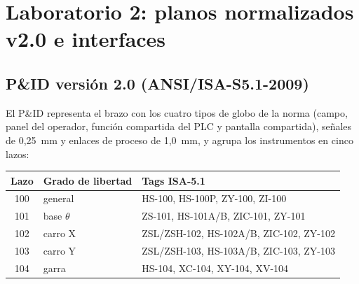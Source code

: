 \documentclass[a4paper,11pt]{article}
\begin{document}
\section{Laboratorio 2: planos normalizados v2.0 e interfaces}
\subsection{P\&ID versión 2.0 (ANSI/ISA-S5.1-2009)}
El P\&ID representa el brazo con los cuatro tipos de globo de la norma (campo, panel del operador, función compartida del PLC y pantalla compartida), señales de 0,25~mm y enlaces de proceso de 1,0~mm, y agrupa los instrumentos en cinco lazos:
\begin{center}\small
\begin{tabularx}{\linewidth}{c >{\raggedright}p{2.4cm} >{\ttfamily\raggedright\arraybackslash}X}
\toprule
\textbf{Lazo} & \textbf{Grado de libertad} & \textrm{\textbf{Tags ISA-5.1}}\\
\midrule
100 & general & HS-100, HS-100P, ZY-100, ZI-100\\
101 & base $\theta$ & ZS-101, HS-101A/B, ZIC-101, ZY-101\\
102 & carro X & ZSL/ZSH-102, HS-102A/B, ZIC-102, ZY-102\\
103 & carro Y & ZSL/ZSH-103, HS-103A/B, ZIC-103, ZY-103\\
104 & garra & HS-104, XC-104, XY-104, XV-104\\
\bottomrule
\end{tabularx}
\end{center}
\end{document}
